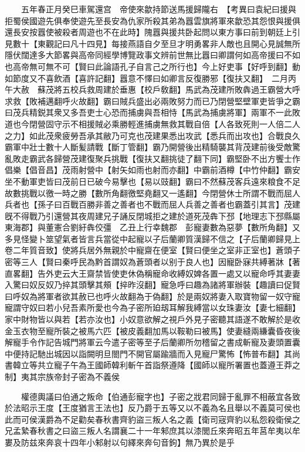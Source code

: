 　　五年春正月癸巳車駕還宫　帝使來歙持節送馬援歸隴右　【考異曰袁紀曰援與拒蜀侯國遊先俱奉使遊先至長安為仇家所殺其弟為囂雲旗將軍來歙恐其怨恨與援俱還長安按囂使被殺者周遊也不在此時】隗囂與援共卧起問以東方事曰前到朝廷上引見數十【東觀記曰凡十四見】每接燕語自夕至旦才明勇畧非人敵也且開心見誠無所隱伏闊達多大節畧與高帝同經學博覽政事文辨前世無比囂曰卿謂何如高帝援曰不如也高帝無可無不可【賢曰此論語孔子自言己之所行也】今上好吏事【好呼到翻】動如節度又不喜飲酒【喜許記翻】囂意不懌曰如卿言反復勝邪【復扶又翻】　二月丙午大赦　蘇茂將五校兵救周建於垂惠【校戶敎翻】馬武為茂建所敗犇過王霸營大呼求救【敗補邁翻呼火故翻】霸曰賊兵盛出必兩敗努力而已乃閉營堅壁軍吏皆爭之霸曰茂兵精鋭其衆又多吾吏士心恐而捕虜與吾相恃【馬武為捕虜將軍】兩軍不一此敗道也今閉營固守示不相援賊必乘勝輕進捕虜無救其戰自倍【人各致死則一人倍二人之力】如此茂衆疲勞吾承其敝乃可克也茂建果悉出攻武【悉兵而出攻也】合戰良久霸軍中壯士數十人斷髪請戰【斷丁管翻】霸乃開營後出精騎襲其背茂建前後受敵驚亂敗走霸武各歸營茂建復聚兵挑戰【復扶又翻挑徒了翻下同】霸堅卧不出方饗士作倡樂【倡音昌】茂雨射營中【射矢如雨也射而亦翻】中霸前酒樽【中竹仲翻】霸安坐不動軍吏皆曰茂前日已破今易擊也【易以豉翻】霸曰不然蘇茂客兵遠來粮食不足故數挑戰以徼一時之勝【數所角翻徼堅堯翻又一遙翻】今閉營休士所謂不戰而屈人兵者也【孫子曰百戰百勝非善之善者也不戰而屈人兵善之善者也霸蓋引其言】茂建旣不得戰乃引還營其夜周建兄子誦反閉城拒之建於道死茂犇下邳【地理志下邳縣屬東海郡】與董憲合劉紆犇佼彊　乙丑上行幸魏郡　彭寵妻數為惡夢【數所角翻】又多見怪變卜筮望氣者皆言兵當從中起寵以子后蘭卿質漢歸不信之【子后蘭卿歸見上卷二年質音致】使將兵居外無親於中寵齋在便室【賢曰便坐之室非正室也】蒼頭子密等三人【賢曰秦呼民為黔首謂奴為蒼頭者以别于良人也】因寵卧寐共縛著牀【著直畧翻】告外吏云大王齋禁皆使吏休偽稱寵命收縛奴婢各置一處又以寵命呼其妻妻入驚曰奴反奴乃捽其頭擊其頰【捽昨沒翻】寵急呼曰趣為諸將軍辦裝【趣讀曰促賢曰呼奴為將軍者欲其赦已也呼火故翻為于偽翻】於是兩奴將妻入取寶物留一奴守寵寵謂守奴曰若小兒吾素所愛也今為子密所廹刼耳解我縛當以女珠妻汝【妻七細翻】家中財物皆以與若【若亦汝也】小奴意欲解之視戶外見子密聽其語遂不敢解於是收金玉衣物至寵所裝之被馬六匹【被皮義翻加馬以鞍勒曰被馬】使妻縫兩縑囊昏夜後解寵手令作記告城門將軍云今遣子密等至子后蘭卿所勿稽留之書成斬寵及妻頭置囊中便持記馳出城因以詣闕明旦閤門不開官屬踰牆而入見寵尸驚怖【怖普布翻】其尚書韓立等共立寵子午為王國師韓利斬午首詣祭遵降【國師以寵所署置也蓋遵王莽之制】夷其宗族帝封子密為不義侯

　　權德輿議曰伯通之叛命【伯通彭寵字也】子密之戕君同歸于亂罪不相蔽宜各致於法昭示王度【王度猶言王法也】反乃爵于五等又以不義為名且舉以不義莫可侯也此而可侯漢爵為不足勸矣春秋書齊豹盜三叛人名之義【衛司宼齊豹以私怨殺衛侯之兄孟縶春秋書之曰盜三叛人名謂襄二十一年邾庶其以漆閭丘來奔昭五年莒牟夷以牟婁及防兹來奔哀十四年小邾射以句繹來奔句音鉤】無乃異於是乎

